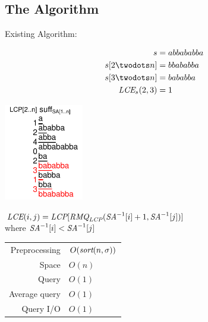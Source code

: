 \documentclass{beamer}
\begin{document}
\subsection{The  Algorithm}
\begin{frame}{Existing Algorithm: }
    \begin{multicols}{2}{
        \begin{align*}
            s&=abbababba\\
            s[2\twodots n]&=bbababba\\
            s[3\twodots n]&=bababba\\
            \LCE_s(2,3)&=1
        \end{align*}
        \newpage
        \begin{center}
            \includegraphics[width=0.26\textwidth,page=1]{../doc/sa+lcp+min.pdf}
        \end{center}
    }
    \end{multicols}
    \begin{center}
        $\textit{LCE}(i,j)=\textit{LCP}[\textit{RMQ}_{\textit{LCP}}(\textit{SA}^{-1}[i] + 1, \textit{SA}^{-1}[j])]$\\
        where $\textit{SA}^{-1}[i] < \textit{SA}^{-1}[j]$\\
        \vspace{1em}
        \begin{tabular}{r l}
            Preprocessing & $O(\textit{sort}(n,\sigma))$ \\
            Space & $O(n)$ \\
            Query & $O(1)$ \\
            Average query & $O(1)$ \\
            Query I/O & $O(1)$ \\
        \end{tabular}
    \end{center}
\end{frame}
\end{document}
